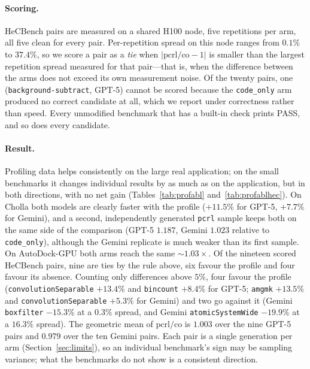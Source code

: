 \paragraph{Scoring.}
HeCBench pairs are measured on a shared H100 node, five repetitions per arm, all five clean for every
pair. Per-repetition spread on this node ranges from $0.1\%$ to $37.4\%$, so we score a pair as a
\emph{tie} when $|\mathrm{pcrl}/\mathrm{co}-1|$ is smaller than the largest repetition spread
measured for that pair---that is, when the difference between the arms does not exceed its own
measurement noise. Of the twenty pairs, one (\texttt{background-subtract}, GPT-5) cannot be scored
because the \texttt{code\_only} arm produced no correct candidate at all, which we report under
correctness rather than speed. Every unmodified benchmark that has a built-in check prints PASS, and
so does every candidate.

\paragraph{Result.}
Profiling data helps consistently on the large real application; on the small benchmarks it changes
individual results by as much as on the application, but in both directions, with no net gain
(Tables~\ref{tab:profabl} and~\ref{tab:profablhec}). On Cholla both models are clearly faster with
the profile ($+11.5\%$ for GPT-5, $+7.7\%$ for Gemini), and a second, independently generated
\texttt{pcrl} sample keeps both on the same side of the comparison (GPT-5 $1.187$, Gemini $1.023$
relative to \texttt{code\_only}), although the Gemini replicate is much weaker than its first sample.
On AutoDock-GPU both arms reach the same ${\sim}1.03\times$. Of the nineteen scored HeCBench pairs,
nine are ties by the rule above, six favour the profile and four favour its absence. Counting only
differences above $5\%$, four favour the profile (\texttt{convolutionSeparable} $+13.4\%$ and
\texttt{bincount} $+8.4\%$ for GPT-5; \texttt{amgmk} $+13.5\%$ and \texttt{convolutionSeparable}
$+5.3\%$ for Gemini) and two go against it (Gemini \texttt{boxfilter} $-15.3\%$ at a $0.3\%$ spread,
and Gemini \texttt{atomicSystemWide} $-19.9\%$ at a $16.3\%$ spread). The geometric mean of
$\mathrm{pcrl}/\mathrm{co}$ is $1.003$ over the nine GPT-5 pairs and $0.979$ over the ten Gemini
pairs. Each pair is a single generation per arm (Section~\ref{sec:limits}), so an individual
benchmark's sign may be sampling variance; what the benchmarks do not show is a consistent direction.

